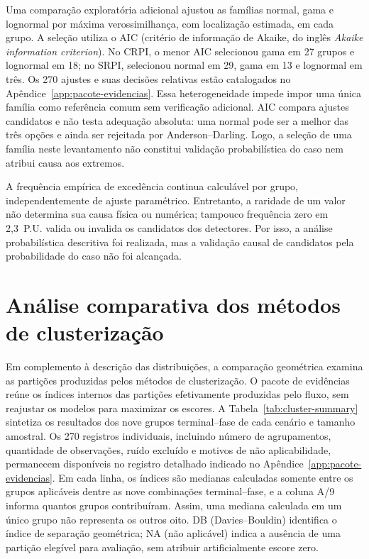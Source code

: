 \documentclass[
	12pt,				%
	openright,			%
	oneside,			%
	a4paper,			%
	chapter=TITLE,		%
	section=TITLE,		%
	subsection=TITLE,	%
	subsubsection=TITLE,%
	english,			%
	brazilian			%
	]{abntex2}
\theoremstyle{definition}
\begin{document}
Uma comparação exploratória adicional ajustou as famílias normal,
gama e lognormal por máxima verossimilhança, com localização estimada,
em cada grupo. A seleção utiliza o AIC (critério de informação de Akaike,
do inglês \textit{Akaike information criterion}). No CRPI, o menor
AIC selecionou gama em 27 grupos e
lognormal em 18; no SRPI, selecionou normal em 29, gama em 13 e
lognormal em três. Os 270 ajustes e suas decisões relativas estão
catalogados no Apêndice~\ref{app:pacote-evidencias}.
Essa heterogeneidade impede impor uma única família como referência
comum sem verificação adicional. AIC compara ajustes candidatos e não
testa adequação absoluta: uma normal pode ser a melhor das três opções
e ainda ser rejeitada por Anderson--Darling. Logo, a seleção de uma
família neste levantamento não constitui validação probabilística do
caso nem atribui causa aos extremos.

A frequência empírica de excedência continua calculável por grupo,
independentemente de ajuste paramétrico. Entretanto, a raridade de um
valor não determina sua causa física ou numérica; tampouco frequência
zero em 2,3~P.U. valida ou invalida os candidatos dos detectores. Por
isso, a análise probabilística descritiva foi realizada, mas a validação
causal de candidatos pela probabilidade do caso não foi alcançada.

\section{Análise comparativa dos métodos de clusterização}
\label{sec:comparacao-clusterizacao}

Em complemento à descrição das distribuições, a comparação geométrica
examina as partições produzidas pelos métodos de clusterização.
O pacote de evidências reúne os índices internos das partições efetivamente produzidas
pelo fluxo, sem reajustar os modelos para maximizar os escores. A
Tabela~\ref{tab:cluster-summary} sintetiza os resultados dos nove grupos
terminal--fase de cada cenário e tamanho amostral. Os 270 registros
individuais, incluindo número de agrupamentos, quantidade de observações,
ruído excluído e motivos de não aplicabilidade, permanecem disponíveis no
registro detalhado indicado no Apêndice~\ref{app:pacote-evidencias}.
Em cada linha, os índices são medianas calculadas somente entre os grupos
aplicáveis dentre as nove combinações terminal--fase, e a coluna A/9
informa quantos grupos contribuíram. Assim, uma mediana calculada em um
único grupo não representa os outros oito.
DB (Davies--Bouldin) identifica o índice de separação geométrica;
NA (não aplicável) indica a ausência de uma partição elegível para
avaliação, sem atribuir artificialmente escore zero.
\end{document}
